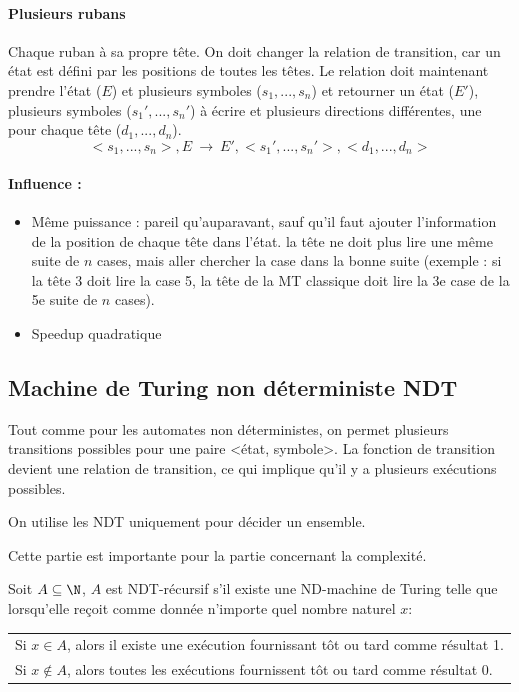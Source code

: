 \paragraph{Plusieurs rubans} Chaque ruban à sa propre tête.
On doit changer la relation de transition, car un état est défini par les positions
de toutes les têtes. Le relation doit maintenant prendre l'état ($E$) et plusieurs
symboles ($s_1,...,s_n$) et retourner un état ($E'$), plusieurs symboles
($s_1',...,s_n'$) à écrire et plusieurs directions différentes, une pour chaque tête
($d_1,...,d_n$).
$$ <s_1,...,s_n>, E \ \rightarrow \ E', <s_1',...,s_n'>, <d_1,...,d_n> $$
\paragraph{Influence :}
\begin{itemize}
	\item Même puissance : pareil qu'auparavant, sauf qu'il faut ajouter l'information de la position de chaque tête dans l'état. la tête ne doit plus lire une même suite de $n$ cases, mais aller chercher la case dans la bonne suite (exemple : si la tête 3 doit lire la case 5, la tête de la MT classique doit lire la 3e case de la 5e suite de $n$ cases).
	\item Speedup quadratique
\end{itemize}

\subsection{Machine de Turing non déterministe NDT}
Tout comme pour les automates non déterministes, on permet plusieurs
transitions possibles pour une paire <état, symbole>. La fonction de transition
devient une relation de transition, ce qui implique qu'il y a plusieurs
 exécutions possibles.

\begin{myrem}
	On utilise les NDT uniquement pour décider un ensemble.
\end{myrem}

\begin{myrem}
	Cette partie est importante pour la partie concernant la complexité.
\end{myrem}

\begin{mydef} Soit $A\subseteq \N$, $A$ est NDT-récursif s'il
	existe une ND-machine de Turing telle que lorsqu'elle reçoit comme
	donnée n'importe quel nombre naturel $x$:\\
	\begin{tabular}{l}
		Si $x\in A$, alors il existe une exécution fournissant tôt ou
		tard comme résultat 1.\\
		Si $x\notin A$, alors toutes les exécutions fournissent tôt ou
		tard comme résultat 0.\\
	\end{tabular}
\end{mydef}

